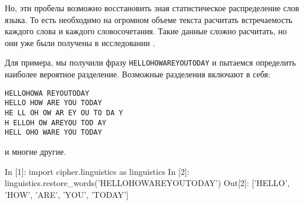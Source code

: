 Но, эти пробелы возможно восстановить зная статистическое распределение
слов языка.
То есть необходимо на огромном объеме текста расчитать встречаемость
каждого слова и каждого словосочетания.
Такие данные сложно расчитать, но они уже были получены
в исследовании \cite{google-ngrams}.

Для примера, мы получили фразу \texttt{HELLOHOWAREYOUTODAY} и пытаемся 
определить наиболее вероятное разделение. Возможные разделения 
включают в себя:

\begin{verbatim}
HELLOHOWA REYOUTODAY
HELLO HOW ARE YOU TODAY
HE LL OH OW AR EY OU TO DA Y
H ELLOH OW AREYOU TOD AY
HELL OHO WARE YOU TODAY
\end{verbatim}

и многие другие.

\begin{listing}[1]{1}
In [1]: import cipher.linguistics as linguistics
In [2]: linguistics.restore_words('HELLOHOWAREYOUTODAY')
Out[2]: ['HELLO', 'HOW', 'ARE', 'YOU', 'TODAY']
\end{listing}
